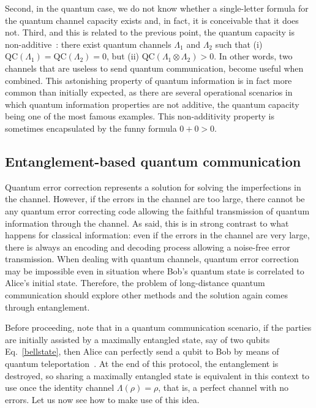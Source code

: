 \documentclass[a4paper]{article}
\begin{document}
Second, in the quantum case, we do not know whether a single-letter formula for the quantum channel capacity exists and, in fact, it is conceivable that it does not. Third, and this is related to the previous point, the quantum capacity is non-additive~\cite{smithyard}: there exist quantum channels $\Lambda_1$ and $\Lambda_2$ such that (i) $\text{QC}(\Lambda_1)=\text{QC}(\Lambda_2)=0$, but (ii) $\text{QC}(\Lambda_1\otimes\Lambda_2)>0$. In other words, two channels that are useless to send quantum communication, become useful when combined. This astonishing property of quantum information is in fact more common than initially expected, as there are several operational scenarios in which quantum information properties are not additive, the quantum capacity being one of the most famous examples. This non-additivity property is sometimes encapsulated by the funny formula $0+0>0$.




\subsection{Entanglement-based quantum communication}

Quantum error correction represents a solution for solving the
imperfections in the channel. However, if the errors in the
channel are too large, there cannot be any quantum error
correcting code allowing the faithful transmission of quantum
information through the channel. As said, this is in strong contrast to what
happens for classical information: even if the errors in the
channel are very large, there is always an encoding and decoding
process allowing a noise-free error transmission. When dealing with quantum channels, quantum
error correction may be impossible even in situation where Bob's
quantum state is correlated to Alice's initial state. Therefore, the problem of long-distance quantum communication should explore other methods and the solution again comes through entanglement.

Before proceeding, note that in a quantum communication scenario, if the parties are initially assisted by a maximally entangled state, say of two qubits Eq.~\eqref{bellstate}, then Alice can perfectly send a qubit to Bob by means of quantum teleportation~\cite{teleportation}. At the end of this protocol, the entanglement is destroyed, so sharing a maximally entangled state is equivalent in this context to use once the identity channel $\Lambda(\rho)=\rho$, that is, a perfect channel with no errors. Let us now see how to make use of this idea.
\end{document}
